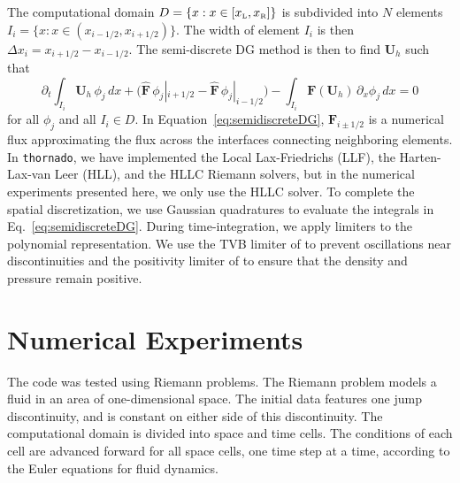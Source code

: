 \documentclass[10pt,preprint]{aastex}
\newcommand{\thornado}{\texttt{thornado}}
\begin{document}
The computational domain $D=\{x:x\in[x_{\mbox{\tiny L}},x_{\mbox{\tiny R}}]\}$ is subdivided into $N$ elements $I_{i}=\{x:x\in(x_{i-1/2},x_{i+1/2})\}$.  
The width of element $I_{i}$ is then $\Delta x_{i}=x_{i+1/2}-x_{i-1/2}$.  
The semi-discrete DG method is then to find $\boldsymbol{U}_{h}$ such that
\begin{equation}
  \partial_{t}\int_{I_{i}}\boldsymbol{U}_{h}\,\phi_{j}\,dx
  +\big(\widehat{\boldsymbol{F}}\,\phi_{j}|_{i+1/2}-\widehat{\boldsymbol{F}}\,\phi_{j}|_{i-1/2}\big)
  -\int_{I_{i}}\boldsymbol{F}(\boldsymbol{U}_{h})\,\partial_{x}\phi_{j}\,dx=0
  \label{eq:semidiscreteDG}
\end{equation}
for all $\phi_{j}$ and all $I_{i}\in D$.  
In Equation~\eqref{eq:semidiscreteDG}, $\widehat{\boldsymbol{F}}_{i\pm1/2}$ is a numerical flux approximating the flux across the interfaces connecting neighboring elements.  
In \thornado, we have implemented the Local Lax-Friedrichs (LLF), the Harten-Lax-van Leer (HLL), and the HLLC Riemann solvers, but in the numerical experiments presented here, we only use the HLLC solver.  
To complete the spatial discretization, we use Gaussian quadratures to evaluate the integrals in Eq.~\eqref{eq:semidiscreteDG}.  
During time-integration, we apply limiters to the polynomial representation.  
We use the TVB limiter of \citet{} to prevent oscillations near discontinuities and the positivity limiter of \citet{ZhangShu2010} to ensure that the density and pressure remain positive.  

\section{Numerical Experiments}

The code was tested using Riemann problems. The Riemann problem models a fluid in an area of one-dimensional space. The initial data features one jump discontinuity, and is constant on either side of this discontinuity. The computational domain is divided into space and time cells. The conditions of each cell are advanced forward for all space cells, one time step at a time, according to the Euler equations for fluid dynamics. \citep{Leveque2002}

\end{document}
